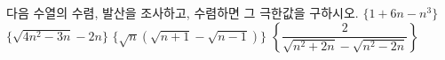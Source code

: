 다음 수열의 수렴, 발산을 조사하고, 수렴하면 그 극한값을 구하시오.
 $\{1+6n-n^3\}$
 $\{\sqrt{4n^2-3n}-2n\}$
 $\{\sqrt{n}(\sqrt{n+1}-\sqrt{n-1})\}$
 $\left\{\dfrac{2}{\sqrt{n^2+2n}-\sqrt{n^2-2n}}\right\}$
